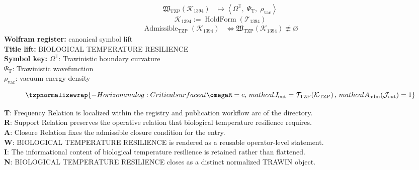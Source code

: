 \noindent
\begin{minipage}[t]{0.48\linewidth}
\begingroup
\small
\[
\begin{aligned}
\mathfrak{W}_{\mathrm{TZP}}\!\left(\mathcal{K}_{1394}\right)
&\longmapsto
\left\langle \Omega^{\mathbb{T}},\; \Psi_{\mathrm{T}},\; \rho_{\mathrm{vac}} \right\rangle
\end{aligned}
\]
\[
\mathcal{K}_{1394}
:=
\operatorname{HoldForm}\!\left(\mathcal{T}_{1394}\right)
\]
\[
\begin{aligned}
\operatorname{Admissible}_{\mathrm{TZP}}\!\left(\mathcal{K}_{1394}\right)
&\Longleftrightarrow
\mathfrak{W}_{\mathrm{TZP}}\!\left(\mathcal{K}_{1394}\right)\not\equiv\varnothing
\end{aligned}
\]
\textbf{Wolfram register:} canonical symbol lift\\
\textbf{Title lift:} BIOLOGICAL TEMPERATURE RESILIENCE\\
\textbf{Symbol key:} \(\Omega^{\mathbb{T}}\): Trawinistic boundary curvature\\ \(\Psi_{\mathrm{T}}\): Trawinistic wavefunction\\ \(\rho_{\mathrm{vac}}\): vacuum energy density
\par
\endgroup
\end{minipage}\hfill
\begin{minipage}[t]{0.48\linewidth}
\[
\tzpnormalizewrap{- Horizon analog: Critical surface at \omegaR = c,\,mathcal{J}_{\mathrm{out}} = \mathcal{T}_{\mathrm{TZP}}\!\left(\mathcal{K}_{\mathrm{TZP}}\right),\,mathcal{A}_{\mathrm{adm}}\!\left(\mathcal{J}_{\mathrm{out}}\right)=1}
\]

\small
\textbf{T}: Frequency Relation is localized within the registry and publication workflow arc of the directory.\\
\textbf{R}: Support Relation preserves the operative relation that biological temperature resilience requires.\\
\textbf{A}: Closure Relation fixes the admissible closure condition for the entry.\\
\textbf{W}: BIOLOGICAL TEMPERATURE RESILIENCE is rendered as a reusable operator-level statement.\\
\textbf{I}: The informational content of biological temperature resilience is retained rather than flattened.\\
\textbf{N}: BIOLOGICAL TEMPERATURE RESILIENCE closes as a distinct normalized TRAWIN object.
\normalsize
\end{minipage}

